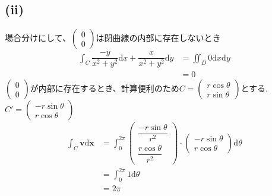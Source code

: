 \documentclass[11pt]{article}
\newcommand{\ds}{\displaystyle}
\begin{document}
	\subsection*{(ii)}
	場合分けにして、$\left(\begin{array}{cc}
		0\\0
	\end{array}\right)$は閉曲線の内部に存在しないとき
	\begin{align*}
		\ds\int_{C}\dfrac{-y}{x^{2}+y^{2}}\mathrm{d}x+\dfrac{x}{x^{2}+y^{2}}\mathrm{d}y
		&=\ds\iint_{D}0\mathrm{d}x\mathrm{d}y\\
		&=0
	\end{align*}
	$\left(\begin{array}{cc}
		0\\0
	\end{array}\right)$が内部に存在するとき、計算便利のため$C=\left(\begin{array}{ccc}
	    r\cos{\theta}\\
	    r\sin{\theta}
	\end{array}\right)$とする.$C'=\left(\begin{array}{cc}
	    -r\sin{\theta}\\
	    r\cos{\theta}
	\end{array}\right)$
	\begin{align*}
		\ds\int_{C}\mathbf{v}\mathrm{d}\mathbf{x}
		&=\ds\int_{0}^{2\pi}\left(\begin{array}{cc}
			\dfrac{-r\sin{\theta}}{r^{2}}\\
			\dfrac{r\cos{\theta}}{r^{2}}
		\end{array}\right)\cdot\left(\begin{array}{cc}
		    -r\sin{\theta}\\
		    r\cos{\theta}
		\end{array}\right)\mathrm{d}\theta\\
		&=\ds\int_{0}^{2\pi}1\mathrm{d}\theta\\
		&=2\pi
	\end{align*}
	
	
	
	
	
	
	
	
	
	
	
	
	
	
	
	
	
	
	
	
	
	
	
	
	
	
	
	
	
	
	
	
	
	
	
	
	
	
	
	
	
	
	
	
	
	
	
	
	
	
	
	
	\newpage
	
	
\end{document}
